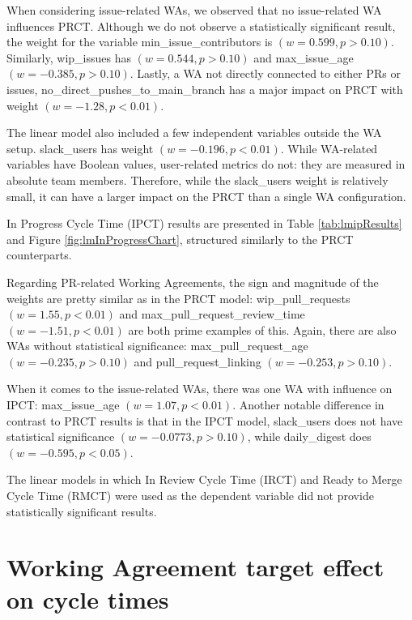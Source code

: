 When considering issue-related WAs, we observed that no issue-related WA influences PRCT. Although we do not observe a statistically significant result, the weight for the variable min\_issue\_contributors is $(w=0.599,p>0.10)$. Similarly, wip\_issues has $(w=0.544,p>0.10)$ and max\_issue\_age $(w=-0.385,p>0.10)$. Lastly, a WA not directly connected to either PRs or issues, no\_direct\_pushes\_to\_main\_branch has a major impact on PRCT with weight $(w=-1.28,p<0.01)$.

The linear model also included a few independent variables outside the WA setup. slack\_users has weight $(w=-0.196,p<0.01)$. While WA-related variables have Boolean values, user-related metrics do not: they are measured in absolute team members. Therefore, while the slack\_users weight is relatively small, it can have a larger impact on the PRCT than a single WA configuration.





In Progress Cycle Time (IPCT) results are presented in Table \ref{tab:lmipResults} and Figure \ref{fig:lmInProgressChart}, structured similarly to the PRCT counterparts.

Regarding PR-related Working Agreements, the sign and magnitude of the weights are pretty similar as in the PRCT model: wip\_pull\_requests $(w=1.55, p<0.01)$ and max\_pull\_request\_review\_time $(w=-1.51, p<0.01)$ are both prime examples of this. Again, there are also WAs without statistical significance: max\_pull\_request\_age $(w=-0.235, p>0.10)$ and pull\_request\_linking $(w=-0.253, p>0.10)$. 



When it comes to the issue-related WAs, there was one WA with influence on IPCT: max\_issue\_age $(w=1.07, p<0.01)$. Another notable difference in contrast to PRCT results is that in the IPCT model, slack\_users does not have statistical significance $(w=-0.0773, p>0.10)$, while daily\_digest does $(w=-0.595, p<0.05)$.



The linear models in which In Review Cycle Time (IRCT) and Ready to Merge Cycle Time (RMCT) were used as the dependent variable did not provide statistically significant results.

\section{Working Agreement target effect on cycle times}


